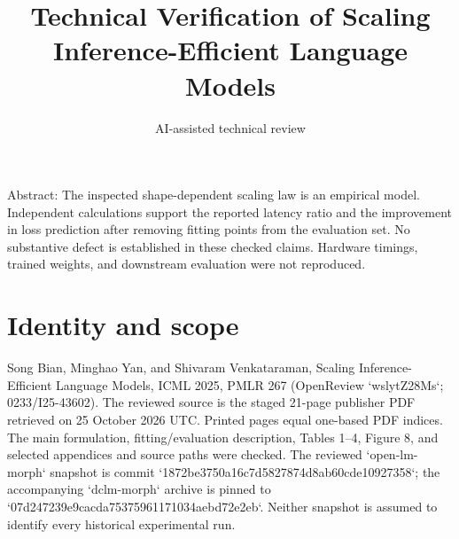 \documentclass[10pt]{article}
\title{Technical Verification of
Scaling Inference-Efficient Language Models}
\author{AI-assisted technical review}
\date{}
\begin{document}
\maketitle
Abstract: The inspected shape-dependent scaling law is an empirical model. Independent calculations support the reported latency ratio and the improvement in loss prediction after removing fitting points from the evaluation set. No substantive defect is established in these checked claims. Hardware timings, trained weights, and downstream evaluation were not reproduced.\par
\section*{Identity and scope}
Song Bian, Minghao Yan, and Shivaram Venkataraman, Scaling Inference-Efficient Language Models, ICML 2025, PMLR 267 (OpenReview `wslytZ28Ms`; 0233/I25-43602). The reviewed source is the staged 21-page publisher PDF retrieved on 25 October 2026 UTC. Printed pages equal one-based PDF indices. The main formulation, fitting/evaluation description, Tables 1–4, Figure 8, and selected appendices and source paths were checked. The reviewed `open-lm-morph` snapshot is commit `1872be3750a16c7d5827874d8ab60cde10927358`; the accompanying `dclm-morph` archive is pinned to `07d247239e9cacda75375961171034aebd72e2eb`. Neither snapshot is assumed to identify every historical experimental run.\par
\end{document}
